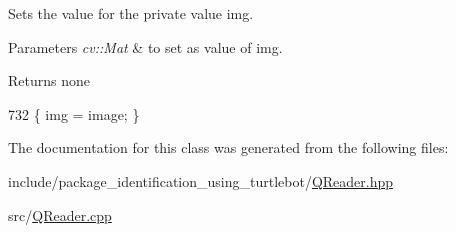 Sets the value for the private value img. 


\begin{DoxyParams}{Parameters}
{\em cv\+::\+Mat} & to set as value of img.\\
\hline
\end{DoxyParams}
\begin{DoxyReturn}{Returns}
none 
\end{DoxyReturn}

\begin{DoxyCode}
732 \{ img = image; \}
\end{DoxyCode}


The documentation for this class was generated from the following files\+:\begin{DoxyCompactItemize}
\item 
include/package\+\_\+identification\+\_\+using\+\_\+turtlebot/\hyperlink{QReader_8hpp}{Q\+Reader.\+hpp}\item 
src/\hyperlink{QReader_8cpp}{Q\+Reader.\+cpp}\end{DoxyCompactItemize}
